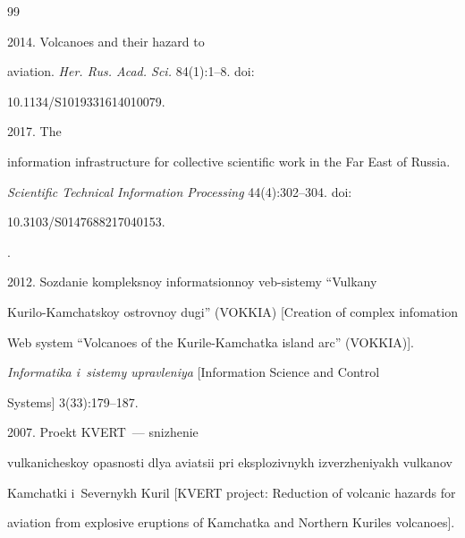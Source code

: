 {\small\frenchspacing


{%




\begin{thebibliography}{99}





\vspace*{-2pt}







 2014. Volcanoes and their hazard to 


aviation. \textit{Her. Rus. Acad. Sci.} 84(1):1--8. doi: 


10.1134\!/\!S1019331614010079.




 2017. The 


information infrastructure for collective scientific work in the Far East of Russia. 


\textit{Scientific Technical Information Processing} 44(4):302--304. doi: 


10.3103\!/\!S0147688217040153.




. 


2012. So\-zda\-nie kompleksnoy informatsionnoy veb-sistemy ``Vulkany 


Kurilo-Kamchatskoy ost\-rov\-noy dugi'' (VOKKIA) [Creation of complex infomation 


Web system ``Volcanoes of the Kurile-Kamchatka island arc'' (VOKKIA)]. 


\textit{Informatika i~sistemy upravleniya} [Information Science and Control 


Systems] 3(33):179--187.




 2007. Proekt KVERT~--- snizhenie 


vulkanicheskoy opasnosti dlya aviatsii pri eksplozivnykh izverzheniyakh vulkanov 


Kamchatki i~Severnykh Kuril [KVERT project: Reduction of volcanic hazards for 


aviation from explosive eruptions of Kamchatka and Northern Kuriles volcanoes]. 



\end{thebibliography}}}
